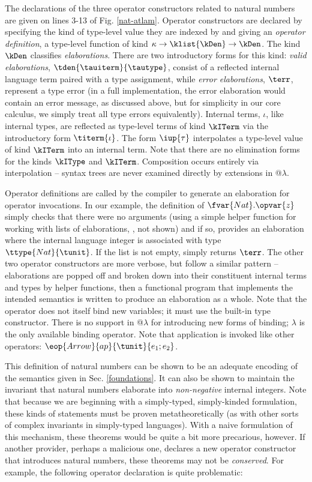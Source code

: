 The declarations of the three operator constructors related to natural numbers are given on lines 3-13 of Fig. \ref{nat-atlam}. Operator constructors are declared by specifying the kind of type-level value they are indexed by and giving an \emph{operator definition}, a type-level function of kind $\kappa \rightarrow \klist{\kDen} \rightarrow \kDen$. The kind $\kDen$ classifies \emph{elaborations}. There are two introductory forms for this kind: \emph{valid elaborations}, $\tden{\tauiterm}{\tautype}$, consist of a reflected internal language term paired with a type assignment, while \emph{error elaborations}, $\terr$, represent a type error (in a full implementation, the error elaboration would contain an error message, as discussed above, but for simplicity in our core calculus, we simply treat all type errors equivalently). Internal terms, $\iota$, like internal types, are reflected as type-level terms of kind $\kITerm$ via the introductory form $\titerm{\iota}$. The form $\iup{\tau}$ interpolates a type-level value of kind $\kITerm$ into an internal term.  Note that there are no elimination forms for the kinds $\kIType$ and $\kITerm$. Composition occurs entirely via interpolation -- syntax trees are never examined directly by extensions in @$\lambda$. 

Operator definitions are called by the compiler to generate an elaboration for operator invocations. In our example, the definition of $\fvar{Nat}.\opvar{z}$ simply checks that there were no arguments (using a simple helper function for working with lists of elaborations, , not shown) and if so, provides an elaboration where the internal language integer  is associated with type $\ttype{Nat}{\tunit}$. If the list is not empty,  simply returns $\terr$. The other two operator constructors are more verbose, but follow a similar pattern -- elaborations are popped off and broken down into their constituent internal terms and types by helper functions, then a functional program that implements the intended semantics is written to produce an elaboration as a whole. Note that the  operator does not itself bind new variables; it must use the built-in  type constructor. There is no support in @$\lambda$ for introducing new forms of binding; $\lambda$ is the only available binding operator. Note that application is invoked like other operators: $\eop{Arrow}{ap}{\tunit}{e_1; e_2}$.

This definition of natural numbers can be shown to be an adequate encoding of the semantics given in Sec. \ref{foundations}. It can also be shown to maintain the invariant that natural numbers elaborate into \emph{non-negative} internal integers. Note that because we are beginning with a simply-typed, simply-kinded formulation, these kinds of statements must be proven metatheoretically (as with other sorts of complex invariants in simply-typed languages). With a naive formulation of this mechanism, these theorems would be quite a bit more precarious, however. If another provider, perhaps a malicious one, declares a new operator constructor that introduces natural numbers, these theorems may not be \emph{conserved}. For example, the following operator declaration is quite problematic:

